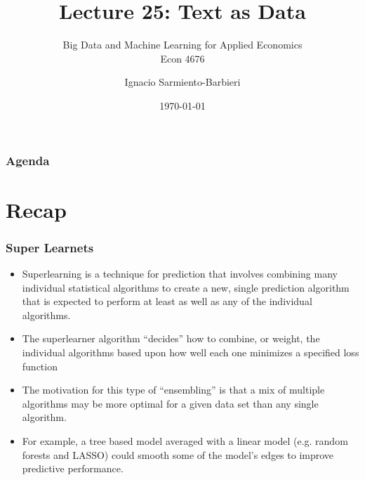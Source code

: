 \documentclass[
  shownotes,
  xcolor={svgnames},
  hyperref={colorlinks,citecolor=DarkBlue,linkcolor=DarkRed,urlcolor=DarkBlue}
  , aspectratio=169]{beamer}
\begin{document}
 
\title[Lecture 25]{Lecture 25:   Text as Data}
\subtitle{Big Data and Machine Learning for Applied Economics \\ Econ 4676}
\date{\today}

\author[Sarmiento-Barbieri]{Ignacio Sarmiento-Barbieri}


\begin{frame}[noframenumbering]
\maketitle
\end{frame}






\begin{frame}
\frametitle{Agenda}

\tableofcontents

\end{frame}

\section{Recap}
\begin{frame}[fragile]
\frametitle{Super Learnets }


\begin{itemize}


\item Superlearning is a technique for prediction that involves combining many individual statistical algorithms  to create a new, single prediction algorithm that is expected to perform at least as well as any of the individual algorithms.
\medskip
\item The superlearner algorithm “decides” how to combine, or weight, the individual algorithms based upon how well each one minimizes a specified loss function
\medskip
\item The motivation for this type of “ensembling” is that a mix of multiple algorithms may be more optimal for a given data set than any single algorithm. 
\medskip
\item For example, a tree based model averaged with a linear model (e.g. random forests and LASSO) could smooth some of the model’s edges to improve predictive performance.
\end{itemize}

\end{frame}
\end{document}
